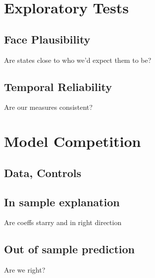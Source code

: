 \section{Exploratory Tests}
\subsection{Face Plausibility}
Are states close to who we'd expect them to be?
\subsection{Temporal Reliability}
Are our measures consistent?
\section{Model Competition}
\subsection{Data, Controls}
\subsection{In sample explanation}
Are coeffs starry and in right direction
\subsection{Out of sample prediction}
Are we right?
